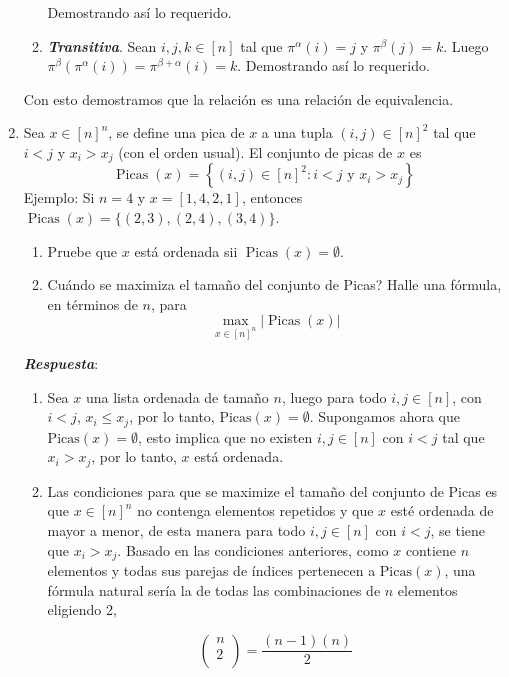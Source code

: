 \documentclass{report}
\begin{document}
\begin{enumerate}
\begin{enumerate}
            Demostrando así lo requerido.
            \item \textit{\textbf{Transitiva}}. Sean $i, j, k \in [n]$ tal que $\pi^\alpha(i) = j$ y $\pi^\beta(j) = k$. Luego $\pi^\beta(\pi^\alpha(i)) = \pi^{\beta + \alpha}(i) = k$. Demostrando así lo requerido.
        \end{enumerate}
        Con esto demostramos que la relación es una relación de equivalencia.

        \item Sea $x \in[n]^n$, se define una pica de $x$ a una tupla $(i, j) \in[n]^2$ tal que $i<j$ y $x_i>x_j$ (con el orden usual). El conjunto de picas de $x$ es
        $$
        \operatorname{Picas}(x)=\left\{(i, j) \in[n]^2: i<j \text { y } x_i>x_j\right\}
        $$
        Ejemplo: Si $n=4$ y $x=[1,4,2,1]$, entonces $\operatorname{Picas}(x)=\{(2,3),(2,4),(3,4)\}$.
        \begin{enumerate}
            \item Pruebe que $x$ está ordenada sii $\operatorname{Picas}(x)=\emptyset$.
            \item Cuándo se maximiza el tamaño del conjunto de Picas? Halle una fórmula, en términos de $n$, para
            $$
            \max _{x \in[n]^n}|\operatorname{Picas}(x)|
            $$
        \end{enumerate}
        \textit{\textbf{Respuesta}}:
        \begin{enumerate}
            \item Sea $x$ una lista ordenada de tamaño $n$, luego para todo $i, j \in [n]$, con $i < j$, $x_i \leq x_j$, por lo tanto, $\text{Picas}(x) = \emptyset$. Supongamos ahora que $\text{Picas}(x) = \emptyset$, esto implica que no existen $i, j \in [n]$ con $i < j$ tal que $x_i > x_j$, por lo tanto, $x$ está ordenada.
            \item Las condiciones para que se maximize el tamaño del conjunto de Picas es que $x \in [n]^n$ no contenga elementos repetidos y que $x$ esté ordenada de mayor a menor, de esta manera para todo $i, j \in [n]$ con $i < j$, se tiene que $x_i > x_j$.
            Basado en las condiciones anteriores, como $x$ contiene $n$ elementos y todas sus parejas de índices pertenecen a $\text{Picas}(x)$, una fórmula natural sería la de todas las combinaciones de $n$ elementos eligiendo 2,

            $$\begin{pmatrix}
                n\\
                2\\
            \end{pmatrix} = \frac{(n-1)(n)}{2}$$
        \end{enumerate}
    \end{enumerate}
\end{document}
